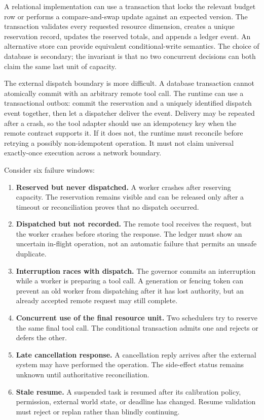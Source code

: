 A relational implementation can use a transaction that locks the relevant budget row or performs a compare-and-swap update against an expected version. The transaction validates every requested resource dimension, creates a unique reservation record, updates the reserved totals, and appends a ledger event. An alternative store can provide equivalent conditional-write semantics. The choice of database is secondary; the invariant is that no two concurrent decisions can both claim the same last unit of capacity.

The external dispatch boundary is more difficult. A database transaction cannot atomically commit with an arbitrary remote tool call. The runtime can use a transactional outbox: commit the reservation and a uniquely identified dispatch event together, then let a dispatcher deliver the event. Delivery may be repeated after a crash, so the tool adapter should use an idempotency key when the remote contract supports it. If it does not, the runtime must reconcile before retrying a possibly non-idempotent operation. It must not claim universal exactly-once execution across a network boundary.

Consider six failure windows:

\begin{enumerate}
  \item \textbf{Reserved but never dispatched.} A worker crashes after reserving capacity. The reservation remains visible and can be released only after a timeout or reconciliation proves that no dispatch occurred.
  \item \textbf{Dispatched but not recorded.} The remote tool receives the request, but the worker crashes before storing the response. The ledger must show an uncertain in-flight operation, not an automatic failure that permits an unsafe duplicate.
  \item \textbf{Interruption races with dispatch.} The governor commits an interruption while a worker is preparing a tool call. A generation or fencing token can prevent an old worker from dispatching after it has lost authority, but an already accepted remote request may still complete.
  \item \textbf{Concurrent use of the final resource unit.} Two schedulers try to reserve the same final tool call. The conditional transaction admits one and rejects or defers the other.
  \item \textbf{Late cancellation response.} A cancellation reply arrives after the external system may have performed the operation. The side-effect status remains unknown until authoritative reconciliation.
  \item \textbf{Stale resume.} A suspended task is resumed after its calibration policy, permission, external world state, or deadline has changed. Resume validation must reject or replan rather than blindly continuing.
\end{enumerate}

